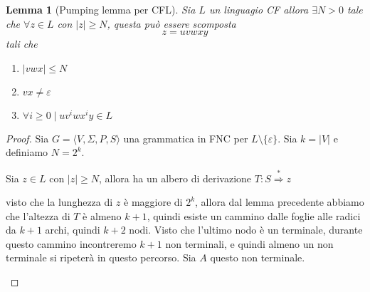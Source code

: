 \documentclass[12pt]{report}
\newtheorem{lemma}{Lemma}
\theoremstyle{definition}
\theoremstyle{regard}
\begin{document}
\begin{lemma}[Pumping lemma per CFL]
	Sia $L$ un linguagio CF allora $\exists N > 0$ tale che $\forall z \in L$ con $|z| \geq N$, questa può essere scomposta
	$$ z = uvwxy $$
	tali che
	\begin{enumerate}
		\item $|vwx| \leq N $
		\item $vx \neq \varepsilon $
		\item $\forall i \geq 0 \mid uv^i w x^i y \in L$
	\end{enumerate}
\end{lemma}
\begin{proof}
	Sia $G = \langle V, \Sigma, P, S \rangle$ una grammatica in FNC per $L \setminus \{ \varepsilon \}$.
	Sia $k = | V | $ e definiamo $N = 2^k$.

	Sia $z \in L$ con $|z| \geq N$, allora ha un albero di derivazione $T : S \overset{*}{\Rightarrow} z$
	\begin{center}
	\end{center}
	visto che la lunghezza di $z$ è maggiore di $2^k$, allora dal lemma precedente abbiamo che l'altezza di $T$ è almeno $k + 1$, quindi esiste un cammino dalle foglie alle radici da $k + 1$ archi, quindi $k + 2$ nodi.
	Visto che l'ultimo nodo è un terminale, durante questo cammino incontreremo $k + 1$ non terminali, e quindi almeno un non terminale si ripeterà in questo percorso.
	Sia $A$ questo non terminale.
	\begin{figure}[H]
		\centering
		\begin{subfigure}{\textwidth}
			\centering
\end{subfigure}
\end{figure}
\end{proof}
\end{document}
